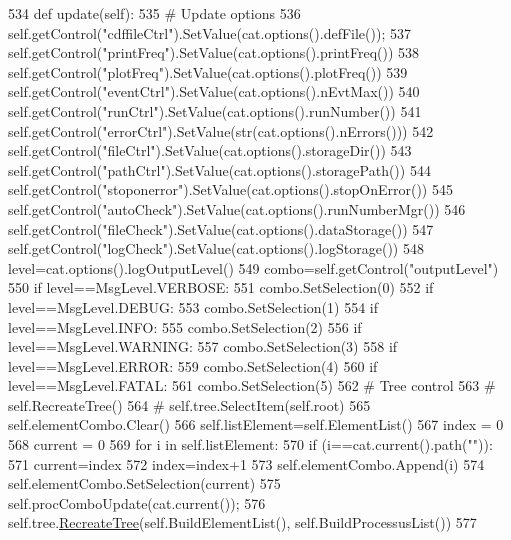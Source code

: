 \begin{DoxyCode}
534     \textcolor{keyword}{def }update(self):
535         \textcolor{comment}{# Update options}
536         self.getControl(\textcolor{stringliteral}{"cdffileCtrl"}).SetValue(cat.options().defFile());
537         self.getControl(\textcolor{stringliteral}{"printFreq"}).SetValue(cat.options().printFreq())
538         self.getControl(\textcolor{stringliteral}{"plotFreq"}).SetValue(cat.options().plotFreq())
539         self.getControl(\textcolor{stringliteral}{"eventCtrl"}).SetValue(cat.options().nEvtMax())
540         self.getControl(\textcolor{stringliteral}{"runCtrl"}).SetValue(cat.options().runNumber())
541         self.getControl(\textcolor{stringliteral}{"errorCtrl"}).SetValue(str(cat.options().nErrors()))
542         self.getControl(\textcolor{stringliteral}{"fileCtrl"}).SetValue(cat.options().storageDir())
543         self.getControl(\textcolor{stringliteral}{"pathCtrl"}).SetValue(cat.options().storagePath())
544         self.getControl(\textcolor{stringliteral}{"stoponerror"}).SetValue(cat.options().stopOnError())
545         self.getControl(\textcolor{stringliteral}{"autoCheck"}).SetValue(cat.options().runNumberMgr())
546         self.getControl(\textcolor{stringliteral}{"fileCheck"}).SetValue(cat.options().dataStorage())
547         self.getControl(\textcolor{stringliteral}{"logCheck"}).SetValue(cat.options().logStorage())
548         level=cat.options().logOutputLevel()
549         combo=self.getControl(\textcolor{stringliteral}{"outputLevel"})
550         \textcolor{keywordflow}{if} level==MsgLevel.VERBOSE:
551             combo.SetSelection(0)
552         \textcolor{keywordflow}{if} level==MsgLevel.DEBUG:
553             combo.SetSelection(1)
554         \textcolor{keywordflow}{if} level==MsgLevel.INFO:
555             combo.SetSelection(2)
556         \textcolor{keywordflow}{if} level==MsgLevel.WARNING:
557             combo.SetSelection(3)
558         \textcolor{keywordflow}{if} level==MsgLevel.ERROR:
559             combo.SetSelection(4)
560         \textcolor{keywordflow}{if} level==MsgLevel.FATAL:
561             combo.SetSelection(5)
562         \textcolor{comment}{# Tree control}
563 \textcolor{comment}{#        self.RecreateTree()        }
564 \textcolor{comment}{#        self.tree.SelectItem(self.root)}
565         self.elementCombo.Clear()
566         self.listElement=self.ElementList()
567         index   = 0
568         current = 0
569         \textcolor{keywordflow}{for} i \textcolor{keywordflow}{in} self.listElement:
570             \textcolor{keywordflow}{if} (i==cat.current().path(\textcolor{stringliteral}{""})):
571                 current=index
572             index=index+1
573             self.elementCombo.Append(i)
574         self.elementCombo.SetSelection(current)
575         self.procComboUpdate(cat.current());
576         self.tree.\hyperlink{namespacetree_af52f98081d696417bca581a778074e7a}{RecreateTree}(self.BuildElementList(), self.BuildProcessusList())
577 
\end{DoxyCode}
\mbox{\label{classAppFrame_1_1AppFrame_a6fd22faaf2687a3dc99632663a5cb081}} 
